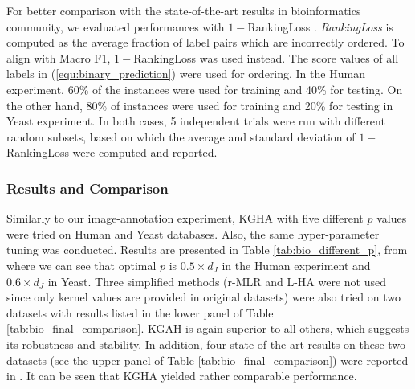 \documentclass[a4paper]{article}
\begin{document}
For better comparison with the state-of-the-art results in bioinformatics community, we evaluated performances with $1-$RankingLoss \citep{Yu_2012_KDD,Yu_2013_TBioinfo}.  
\emph{RankingLoss} is computed as the average fraction of label pairs which are incorrectly ordered. To align with Macro F1, $1-$RankingLoss was used instead.  
The score values of all labels in (\ref{equ:binary_prediction}) were used for ordering. 
In the \textsf{Human} experiment, 60\% of the instances were used for training and 40\% for testing. 
On the other hand, 80\% of instances were used for training and 20\% for testing in \textsf{Yeast} experiment. In both cases,  
5 independent trials were run with different random subsets, based on which 
the average and standard deviation of $1-$RankingLoss were computed and reported.    


\subsubsection{Results and Comparison}
Similarly to our image-annotation experiment, KGHA with five different $p$ values were tried on  \textsf{Human} and  \textsf{Yeast} databases. 
Also, the same hyper-parameter tuning was conducted. 
Results are presented in Table \ref{tab:bio_different_p}, 
from where we can see that optimal $p$ is $0.5\times d_J$ in the \textsf{Human} experiment and $0.6\times d_J$ in \textsf{Yeast}.
Three simplified methods (r-MLR and L-HA were not 
used since only kernel values are provided in original datasets) were also tried on two datasets with results 
listed in the lower panel of Table \ref{tab:bio_final_comparison}. 
KGAH is again superior to all others, which suggests its robustness and 
stability. In addition, four state-of-the-art results on these two datasets (see the upper panel of Table \ref{tab:bio_final_comparison}) were reported 
in \citeauthor{Yu_2013_TBioinfo} \cite{Yu_2012_KDD,Yu_2013_TBioinfo}. It can be seen that KGHA yielded rather comparable performance.     
\end{document}
